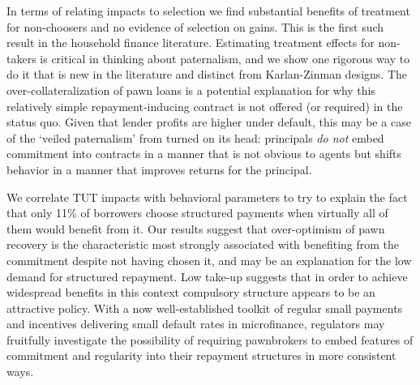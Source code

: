 \documentclass[12pt, a4paper, colorinlistoftodos]{article}
\begin{document}
In terms of relating impacts to selection we find substantial benefits of treatment for non-choosers and no evidence of selection on gains. This is the first such result in the household finance literature.  Estimating treatment effects for non-takers is critical in thinking about paternalism, and we show one rigorous way to do it that is new in the literature and distinct from Karlan-Zinman designs. 
 The over-collateralization of pawn loans is a  potential explanation for why this relatively simple repayment-inducing contract is not offered (or required) in the status quo.  Given that lender profits are higher under default, this may be a case of the `veiled paternalism' from \cite{Laibson2018} turned on its head:  principals \textit{do not} embed commitment into contracts in a manner that is not obvious to agents but shifts behavior in a manner that improves returns for the principal.  



We correlate TUT impacts with behavioral parameters to try to explain the fact that only 11\% of borrowers choose structured payments when virtually all of them would benefit from it.  Our results suggest that over-optimism of pawn recovery is the characteristic most strongly associated with benefiting from the commitment despite not having chosen it, and may be an explanation for the low demand for structured repayment. Low take-up suggests that in order to achieve widespread benefits in this context compulsory structure appears to be an attractive policy. With a now well-established toolkit of regular small payments and incentives delivering small default rates in microfinance, regulators may fruitfully investigate the possibility of requiring pawnbrokers to embed features of commitment and regularity into their repayment structures in more consistent ways.



\end{document}
